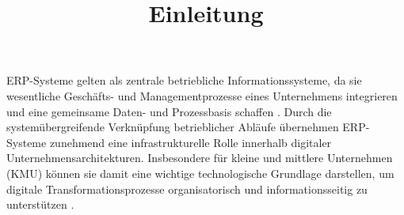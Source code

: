 \title{Einleitung}
\label{sec:einleitung}

ERP-Systeme gelten als zentrale betriebliche Informationssysteme, da sie 
wesentliche Geschäfts- und Managementprozesse eines Unternehmens 
integrieren und eine gemeinsame Daten- und Prozessbasis schaffen 
\parencite{Shiau2009}. Durch die systemübergreifende Verknüpfung 
betrieblicher Abläufe übernehmen ERP-Systeme zunehmend eine infrastrukturelle 
Rolle innerhalb digitaler Unternehmensarchitekturen. Insbesondere für 
kleine und mittlere Unternehmen (KMU) können sie damit eine wichtige 
technologische Grundlage darstellen, um digitale Transformationsprozesse 
organisatorisch und informationsseitig zu unterstützen \parencite{Leyh2019}.







